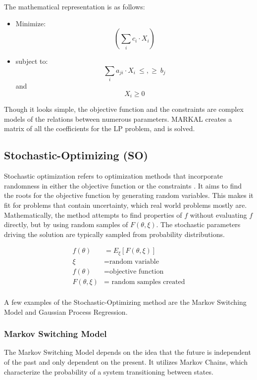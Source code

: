 The mathematical representation is as follows:

\begin{itemize}
	\item[] Minimize:
	\[(\sum_i c_i \cdot X_i) \]
	\item[]subject to:
	\[ \sum_i a_{ji} \cdot X_i \ \leq , \geq \  b_j \] \quad \textrm{and} \quad \[ 	X_i \geq 0 \]
	
\end{itemize}
	
	

Though it looks simple, the objective function and the
constraints are complex models of the relations between
numerous parameters. \gls{MARKAL} creates a matrix
of all the coefficients for the \gls{LP} problem, and is
solved. 


\subsection{Stochastic-Optimizing (SO)}
Stochastic optimization refers to optimization methods
that incorporate randomness in either the objective function
or the constraints \cite{lauren_stochastic_2015}. It aims to find
the roots for the objective function by generating random variables.
This makes it fit for problems that contain uncertainty, which
real world problems mostly are. 
Mathematically, the method attempts to find properties of $f$ without
evaluating $f$ directly, but by using random samples of $F(\theta, \xi).$
The stochastic parameters driving the solution are typically sampled
from probability distributions.

\begin{align}
	f(\theta) &= E_{\xi} [F(\theta, \xi)] \\
	\xi &= \mbox{random variable} \\
	f(\theta) &= \mbox{objective function} \\
	F(\theta,\xi) &= \mbox{ random samples created} \\
\end{align}

A few examples of the Stochastic-Optimizing method are
the Markov Switching Model and Gaussian Process Regression.


\subsubsection{Markov Switching Model}
The Markov Switching Model depends on the idea that
the future is independent of the past and only dependent
on the present. It utilizes Markov Chains, which 
characterize the probability of a system transitioning
between states.

